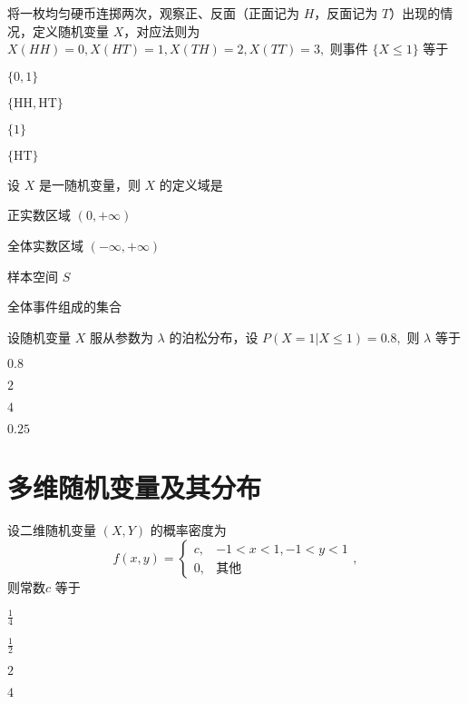 \documentclass{exam-zh}
\begin{document}
\begin{question}
  将一枚均匀硬币连掷两次，观察正、反面（正面记为 $H$，反面记为 $T$）出现的情况，定义随机变量 $X$，对应法则为  
  $X(HH) = 0, X(HT) = 1, X(TH) = 2, X(TT) = 3,$ 
  则事件 $\{X \leq 1\}$ 等于 \paren[B]
  \begin{choices}
    \item $\{0, 1\}$  
    \item $\{\text{HH}, \text{HT}\}$  
    \item $\{1\}$  
    \item $\{\text{HT}\}$  
  \end{choices}
\end{question}

\begin{question}
  设 $X$ 是一随机变量，则 $X$ 的定义域是 \paren[C]
  \begin{choices}
    \item 正实数区域 $(0, +\infty)$  
    \item 全体实数区域 $(-\infty, +\infty)$  
    \item 样本空间 $S$  
    \item 全体事件组成的集合  
  \end{choices}
\end{question}

\begin{question}
  设随机变量 $X$ 服从参数为 $\lambda$ 的泊松分布，设  
  $P(X = 1 | X \leq 1) = 0.8,$
  则 $\lambda$ 等于 \paren[C]
  \begin{choices}
    \item $0.8$  
    \item $2$  
    \item $4$  
    \item $0.25$  
  \end{choices}
\end{question}

\section{多维随机变量及其分布}

\begin{question}
  设二维随机变量 $(X, Y)$ 的概率密度为  
  $$f(x, y) = 
  \begin{cases} 
  c, & -1 < x < 1, -1 < y < 1 \\ 
  0, & \text{其他} 
  \end{cases},$$ 则常数$c$
  等于 \paren[A]
  \begin{choices}
    \item $\frac{1}{4}$  
    \item $\frac{1}{2}$  
    \item $2$  
    \item $4$  
  \end{choices}
\end{question}
\end{document}
